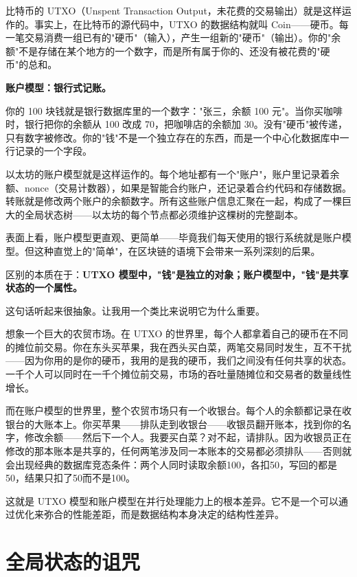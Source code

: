 \documentclass[a4paper,12pt,openany]{ctexbook}
\begin{document}
比特币的 UTXO（Unspent Transaction Output，未花费的交易输出）就是这样运作的。事实上，在比特币的源代码中，UTXO 的数据结构就叫 Coin——硬币。每一笔交易消费一组已有的"硬币"（输入），产生一组新的"硬币"（输出）。你的"余额"不是存储在某个地方的一个数字，而是所有属于你的、还没有被花费的"硬币"的总和。

\textbf{账户模型：银行式记账。}

你的 100 块钱就是银行数据库里的一个数字："张三，余额 100 元"。当你买咖啡时，银行把你的余额从 100 改成 70，把咖啡店的余额加 30。没有"硬币"被传递，只有数字被修改。你的"钱"不是一个独立存在的东西，而是一个中心化数据库中一行记录的一个字段。

以太坊的账户模型就是这样运作的。每个地址都有一个"账户"，账户里记录着余额、nonce（交易计数器），如果是智能合约账户，还记录着合约代码和存储数据。转账就是修改两个账户的余额数字。所有这些账户信息汇聚在一起，构成了一棵巨大的全局状态树——以太坊的每个节点都必须维护这棵树的完整副本。

表面上看，账户模型更直观、更简单——毕竟我们每天使用的银行系统就是账户模型。但这种直觉上的"简单"，在区块链的语境下会带来一系列深刻的后果。

区别的本质在于：\textbf{UTXO 模型中，"钱"是独立的对象；账户模型中，"钱"是共享状态的一个属性。}

这句话听起来很抽象。让我用一个类比来说明它为什么重要。

想象一个巨大的农贸市场。在 UTXO 的世界里，每个人都拿着自己的硬币在不同的摊位前交易。你在东头买苹果，我在西头买白菜，两笔交易同时发生，互不干扰——因为你用的是你的硬币，我用的是我的硬币，我们之间没有任何共享的状态。一千个人可以同时在一千个摊位前交易，市场的吞吐量随摊位和交易者的数量线性增长。

而在账户模型的世界里，整个农贸市场只有一个收银台。每个人的余额都记录在收银台的大账本上。你买苹果——排队走到收银台——收银员翻开账本，找到你的名字，修改余额——然后下一个人。我要买白菜？对不起，请排队。因为收银员正在修改的那本账本是共享的，任何两笔涉及同一本账本的交易都必须排队——否则就会出现经典的数据库竞态条件：两个人同时读取余额100，各扣50，写回的都是50，结果只扣了50而不是100。

这就是 UTXO 模型和账户模型在并行处理能力上的根本差异。它不是一个可以通过优化来弥合的性能差距，而是数据结构本身决定的结构性差异。


\section*{全局状态的诅咒}
\end{document}

